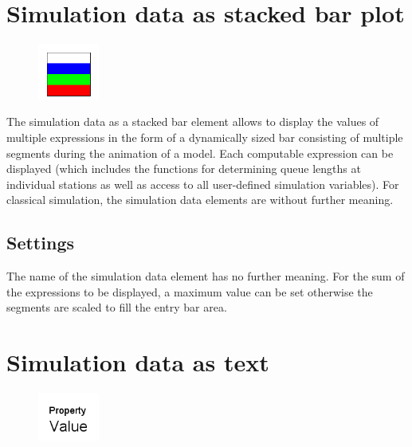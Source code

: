 \section{Simulation data as stacked bar plot}
\label{ref:ModelElementAnimationBarStack}

\begin{figure}
\vspace{-22pt}
\includegraphics[width=2cm]{imageModelElementAnimationBarStack.png}
\vspace{-22pt}
\end{figure}

The simulation data as a stacked bar element allows to display the values of multiple expressions in the form of
a dynamically sized bar consisting of multiple segments during the animation of a model. Each computable expression
can be displayed (which includes the functions for determining queue lengths at individual stations as well as access
to all user-defined simulation variables). For classical simulation, the simulation data elements are without further meaning.

\subsection*{Settings}

The name of the simulation data element has no further meaning.
For the sum of the expressions to be displayed, a maximum value can be set 
otherwise the segments are scaled to fill the entry bar area.


\section{Simulation data as text}
\label{ref:ModelElementAnimationText}

\begin{figure}
\vspace{-22pt}
\includegraphics[width=2cm]{imageModelElementAnimationText.png}
\vspace{-22pt}
\end{figure}

